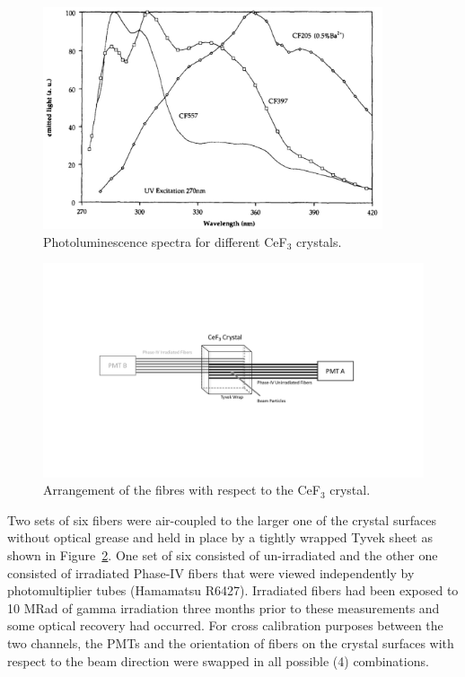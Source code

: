 \documentclass[a4paper,11pt]{article}
\begin{document}
\begin{figure}[ht]
\begin{center}
      \includegraphics[width=10cm]{Figures/SpectrumCeF3.jpg}
\caption{\small Photoluminescence spectra for different CeF$_3$ crystals.}
    \label{fig:cef3spectrum}
\end{center}
\end{figure}


\begin{figure}[ht]
\begin{center}\vspace{-1pc}
      \includegraphics[width=10 cm]{Figures/CeF3Arrangement.pdf}
\caption{\small Arrangement of the fibres with respect to the CeF$_3$ crystal.}
    \label{fig:CeF3Arrangement}
\end{center}
\end{figure}

Two sets of six fibers were air-coupled to the larger one of the crystal surfaces without optical grease and held in place by a tightly wrapped Tyvek sheet as shown in Figure~\ref{fig:CeF3Arrangement}.   One set of six consisted of un-irradiated and the other one consisted of irradiated Phase-IV fibers that were viewed independently by photomultiplier tubes (Hamamatsu R6427).  Irradiated fibers had been exposed to 10 MRad of gamma irradiation three months prior to these measurements and some optical recovery had occurred.  For cross calibration purposes between the two channels, the PMTs and the orientation of fibers on the crystal surfaces with respect to the beam direction were swapped in all possible (4) combinations.  
\end{document}
